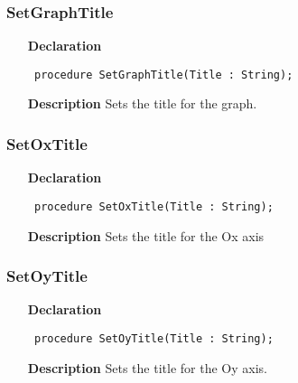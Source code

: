 \documentclass[12pt,a4paper,oneside]{report}
\newcommand{\declarationitem}[1]{\textbf{#1}}
\newcommand{\descriptiontitle}[1]{\textbf{#1}}
\newcommand{\code}[1]{\texttt{#1}}
\begin{document}
\subsubsection{SetGraphTitle}
\label{uplot-SetGraphTitle}
\begin{itemize}\item[\declarationitem{Declaration}\hfill]
	\begin{flushleft}
		\code{
			procedure SetGraphTitle(Title : String);}
		
	\end{flushleft}
	
	\par
	\item[\descriptiontitle{Description}]
	Sets the title for the graph.
	
\end{itemize}
\subsubsection{SetOxTitle}
\label{uplot-SetOxTitle}
\begin{itemize}\item[\declarationitem{Declaration}\hfill]
	\begin{flushleft}
		\code{
			procedure SetOxTitle(Title : String);}
		
	\end{flushleft}
	
	\par
	\item[\descriptiontitle{Description}]
	Sets the title for the Ox axis
	
\end{itemize}
\subsubsection{SetOyTitle}
\label{uplot-SetOyTitle}
\begin{itemize}\item[\declarationitem{Declaration}\hfill]
	\begin{flushleft}
		\code{
			procedure SetOyTitle(Title : String);}
		
	\end{flushleft}
	
	\par
	\item[\descriptiontitle{Description}]
	Sets the title for the Oy axis.
	
\end{itemize}
\end{document}
